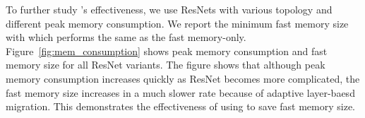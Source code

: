 
To further study \name's effectiveness, we use ResNets with various topology and different peak memory consumption. We report the minimum fast memory size with which \name performs the same as the fast memory-only. %
Figure~\ref{fig:mem_consumption} shows peak memory consumption and fast memory size for all ResNet variants. The figure shows that although peak memory consumption increases quickly as ResNet becomes more complicated, the fast memory size increases in a much slower rate because of adaptive layer-baesd migration.  
This demonstrates the effectiveness of using \name to save fast memory size.
\vspace{-10pt}


